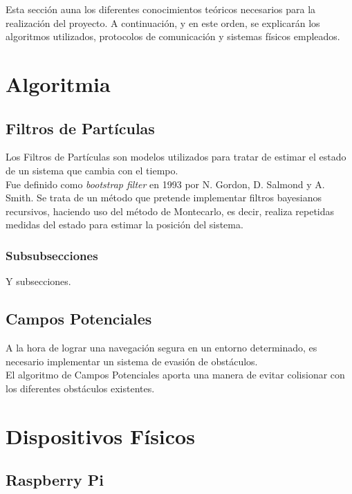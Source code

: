 

Esta sección auna los diferentes conocimientos teóricos necesarios para la realización del proyecto. A continuación, y en este orden, se explicarán los algoritmos utilizados, protocolos de comunicación y sistemas físicos empleados.

\section{Algoritmia}


\subsection{Filtros de Partículas}

Los Filtros de Partículas son modelos utilizados para tratar de estimar el estado de un sistema que cambia con el tiempo. 
\\Fue definido como \textit{bootstrap filter} en 1993 por N. Gordon, D. Salmond y A. Smith.  Se trata de un método que pretende implementar filtros bayesianos recursivos, haciendo uso del método de Montecarlo, es decir, realiza repetidas medidas del estado para estimar la posición del sistema.
\\ 

\subsubsection{Subsubsecciones}

Y subsecciones. 

\subsection{Campos Potenciales}

A la hora de lograr una navegación segura en un entorno determinado, es necesario implementar un sistema de evasión de obstáculos. 
\\El algoritmo de Campos Potenciales aporta una manera de evitar colisionar con los diferentes obstáculos existentes.

\section{Dispositivos Físicos}

\subsection{Raspberry Pi}

